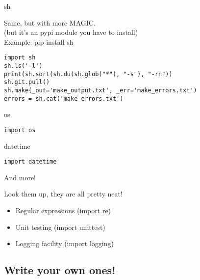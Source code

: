\documentclass[ignorenonframetext,]{beamer}
\begin{document}
\begin{frame}[fragile]{sh}

    Same, but with more MAGIC.\\
    (but it's an pypi module you have to install)\\
    Example: pip install sh

    \begin{tcolorbox}
    \begin{verbatim}
import sh
sh.ls('-l')
print(sh.sort(sh.du(sh.glob("*"), "-s"), "-rn"))
sh.git.pull()
sh.make(_out='make_output.txt', _err='make_errors.txt')
errors = sh.cat('make_errors.txt')
    \end{verbatim}
    \end{tcolorbox}
\end{frame}

\begin{frame}[fragile]{os}
    \begin{tcolorbox}
    \begin{verbatim}
import os
    \end{verbatim}
    \end{tcolorbox}
\end{frame}

\begin{frame}[fragile]{datetime}
    \begin{tcolorbox}
    \begin{verbatim}
import datetime
    \end{verbatim}
    \end{tcolorbox}
\end{frame}

\begin{frame}[fragile]{And more!}

    Look them up, they are all pretty neat!

    \begin{itemize}
        \item Regular expressions (import re)
        \item Unit testing (import unittest)
        \item Logging facility (import logging)
    \end{itemize}
\end{frame}

\subsection{Write your own ones!}
\end{document}
